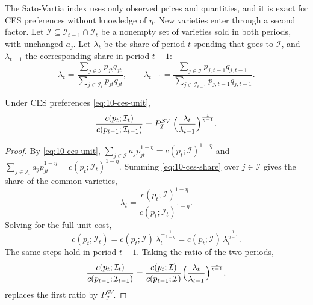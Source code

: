 The Sato-Vartia index uses only observed prices and quantities, and it is exact for CES preferences without
knowledge of $\eta$. New varieties enter through a second factor. Let $\mathcal{I} \subseteq
\mathcal{I}_{t-1}\cap\mathcal{I}_t$ be a nonempty set of varieties sold in both periods, with unchanged $a_j$.
Let $\lambda_t$ be the share of period-$t$ spending that goes to $\mathcal{I}$, and $\lambda_{t-1}$ the
corresponding share in period $t-1$:
\begin{equation*}
  \lambda_t = \frac{\sum_{j\in\mathcal{I}}p_{jt}q_{jt}}{\sum_{j\in\mathcal{I}_t}p_{jt}q_{jt}}, \qquad
  \lambda_{t-1} = \frac{\sum_{j\in\mathcal{I}}p_{j,t-1}q_{j,t-1}}{\sum_{j\in\mathcal{I}_{t-1}}p_{j,t-1}q_{j,t-1}}.
\end{equation*}

\begin{proposition}\label{prop:10-feenstra}
Under CES preferences \eqref{eq:10-ces-unit},
\begin{equation}\label{eq:10-feenstra}
  \frac{c(p_t;\mathcal{I}_t)}{c(p_{t-1};\mathcal{I}_{t-1})}
  = P^{SV}_{\mathcal{I}}\,\Bigl(\frac{\lambda_t}{\lambda_{t-1}}\Bigr)^{\frac{1}{\eta-1}} .
\end{equation}
\end{proposition}

\begin{proof}
By \eqref{eq:10-ces-unit}, $\sum_{j\in\mathcal{I}}a_jp_{jt}^{1-\eta} = c(p_t;\mathcal{I})^{1-\eta}$ and
$\sum_{j\in\mathcal{I}_t}a_jp_{jt}^{1-\eta} = c(p_t;\mathcal{I}_t)^{1-\eta}$. Summing \eqref{eq:10-ces-share}
over $j \in \mathcal{I}$ gives the share of the common varieties,
\begin{equation*}
  \lambda_t = \frac{c(p_t;\mathcal{I})^{1-\eta}}{c(p_t;\mathcal{I}_t)^{1-\eta}} .
\end{equation*}
Solving for the full unit cost,
\begin{equation*}
  c(p_t;\mathcal{I}_t) = c(p_t;\mathcal{I})\,\lambda_t^{-\frac{1}{1-\eta}} = c(p_t;\mathcal{I})\,\lambda_t^{\frac{1}{\eta-1}} .
\end{equation*}
The same steps hold in period $t-1$. Taking the ratio of the two periods,
\begin{equation*}
  \frac{c(p_t;\mathcal{I}_t)}{c(p_{t-1};\mathcal{I}_{t-1})}
  = \frac{c(p_t;\mathcal{I})}{c(p_{t-1};\mathcal{I})}\Bigl(\frac{\lambda_t}{\lambda_{t-1}}\Bigr)^{\frac{1}{\eta-1}} .
\end{equation*}
 replaces the first ratio by $P^{SV}_{\mathcal{I}}$.
\end{proof}

